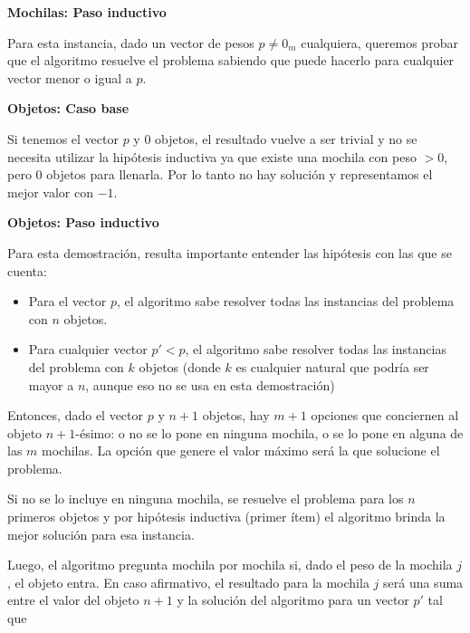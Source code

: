 \vspace{5mm}

{\Large\textbf{Mochilas: Paso inductivo}}

\vspace{5mm}

Para esta instancia, dado un vector de pesos $p \neq 0_m$ cualquiera, queremos probar que el algoritmo resuelve el problema sabiendo que puede hacerlo para cualquier vector menor o igual a $p$.

\vspace{5mm}

{\large\textbf{Objetos: Caso base}}

\vspace{5mm}

Si tenemos el vector $p$ y $0$ objetos, el resultado vuelve a ser trivial y no se necesita utilizar la hipótesis inductiva ya que existe una mochila con peso $> 0$, pero $0$ objetos para llenarla. Por lo tanto no hay solución y representamos el mejor valor con $-1$.

\vspace{5mm}

{\large\textbf{Objetos: Paso inductivo}}

\vspace{5mm}

Para esta demostración, resulta importante entender las hipótesis con las que se cuenta:

\begin{itemize}
\item Para el vector $p$, el algoritmo sabe resolver todas las instancias del problema con $n$ objetos.
\item Para cualquier vector $p' < p$, el algoritmo sabe resolver todas las instancias del problema con $k$ objetos (donde $k$ es cualquier natural que podría ser mayor a $n$, aunque eso no se usa en esta demostración)
\end{itemize}

Entonces, dado el vector $p$ y $n + 1$ objetos, hay $m + 1$ opciones que conciernen al objeto $n + 1$-ésimo: o no se lo pone en ninguna mochila, o se lo pone en alguna de las $m$ mochilas. La opción que genere el valor máximo será la que solucione el problema.

Si no se lo incluye en ninguna mochila, se resuelve el problema para los $n$ primeros objetos y por hipótesis inductiva (primer ítem) el algoritmo brinda la mejor solución para esa instancia.

Luego, el algoritmo pregunta mochila por mochila si, dado el peso de la mochila $j$, el objeto entra. En caso afirmativo, el resultado para la mochila $j$ será una suma entre el valor del objeto $n + 1$ y la solución del algoritmo para un vector $p'$ tal que

